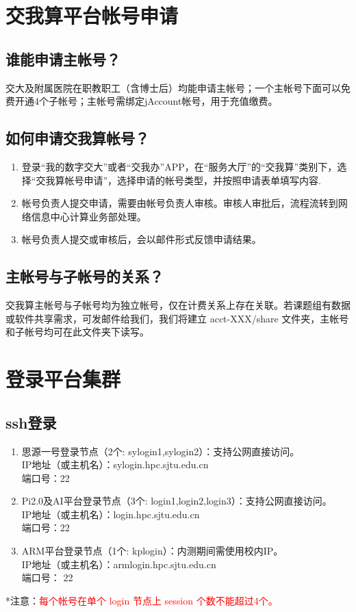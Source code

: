 \documentclass[cn, 12pt, hang, black, chinese]{elegantbook}
\begin{document}
\section{交我算平台帐号申请}

\subsection*{谁能申请主帐号？}
交大及附属医院在职教职工（含博士后）均能申请主帐号；一个主帐号下面可以免费开通4个子帐号；主帐号需绑定jAccount帐号，用于充值缴费。

\subsection*{如何申请交我算帐号？}
\begin{enumerate}
\item 登录“我的数字交大”或者“交我办”APP，在“服务大厅”的“交我算”类别下，选择“交我算帐号申请”，选择申请的帐号类型，并按照申请表单填写内容.
\item 帐号负责人提交申请，需要由帐号负责人审核。审核人审批后，流程流转到网络信息中心计算业务部处理。
\item 帐号负责人提交或审核后，会以邮件形式反馈申请结果。
\end{enumerate}

\subsection*{主帐号与子帐号的关系？}
交我算主帐号与子帐号均为独立帐号，仅在计费关系上存在关联。若课题组有数据或软件共享需求，可发邮件给我们，我们将建立 acct-XXX/share 文件夹，主帐号和子帐号均可在此文件夹下读写。

\section{登录平台集群}

\subsection*{ssh登录}
\begin{enumerate}
\item 思源一号登录节点（2个: sylogin1,sylogin2）：支持公网直接访问。\\IP地址（或主机名）：sylogin.hpc.sjtu.edu.cn\\端口号：22
\item Pi2.0及AI平台登录节点（3个: login1,login2,login3）：支持公网直接访问。\\IP地址（或主机名）：login.hpc.sjtu.edu.cn\\端口号：22
\item ARM平台登录节点（1个: kplogin）：内测期间需使用校内IP。\\IP地址（或主机名）：armlogin.hpc.sjtu.edu.cn\\端口号： 22
\end{enumerate}
*注意：\textcolor{red}{每个帐号在单个 login 节点上 session 个数不能超过4个。}
\end{document}
